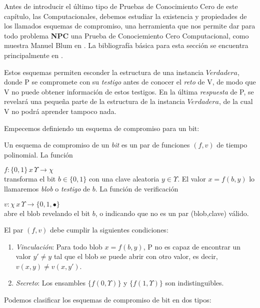 Antes de introducir el último tipo de Pruebas de Conocimiento Cero de este capítulo, las Computacionales, debemos estudiar la existencia y propiedades de los llamados esquemas de compromiso, una herramienta que nos permite dar para todo problema \textbf{NPC} una Prueba de Conociemiento Cero Computacional, como muestra Manuel Blum en  \citep{blum}. La bibliografía básica para esta sección se encuentra principalmente en \citep{pieprzyk2013fundamentals,damgardcommitment}.

Estos esquemas permiten esconder la estructura de una instancia $Verdadera$, donde P se compromete con su \textit{testigo} antes de conocer el \textit{reto} de V, de modo que V no puede obtener información de estos testigos. En la última \textit{respuesta} de P, se revelará una pequeña parte de la estructura de la instancia $Verdadera$, de la cual V no podrá aprender tampoco nada.


Empecemos definiendo un esquema de compromiso para un bit:


\begin{definition}\label{commit:def}
	Un esquema de compromiso de un \textit{bit} es un par de funciones $(f,v)$ de tiempo polinomial. La función
	
	$
	f:\{0,1\}\, x\, \Upsilon \to \chi
	$
	\\transforma el bit $b\in \{0,1\}$ con una clave aleatoria $y\in \Upsilon$. El valor $x=f(b,y)$ lo llamaremos \textit{blob} o \textit{testigo} de $b$. La función de verificación
	
	$
	v:\chi \, x \, \Upsilon \to \{0,1,\bullet\}
	$
	\\abre el blob revelando el bit $b$, o indicando que no es un par (blob,clave) válido.
	
	El par $(f,v)$ debe cumplir la siguientes condiciones:
	\begin{enumerate}
		\item \textit{Vinculación}: Para todo blob $x=f(b,y)$, P no es capaz de encontrar un valor $y' \neq y$ tal que el blob se puede abrir con otro valor, es decir, $v(x,y) \neq v(x,y')$.
		
		\item \textit{Secreto}: Los ensambles $\{f(0,\Upsilon)\}$ y $\{f(1,\Upsilon)\}$ son indistinguibles.
	\end{enumerate}
	
\end{definition}

\hfil

Podemos clasificar los esquemas de compromiso de bit en dos tipos:

